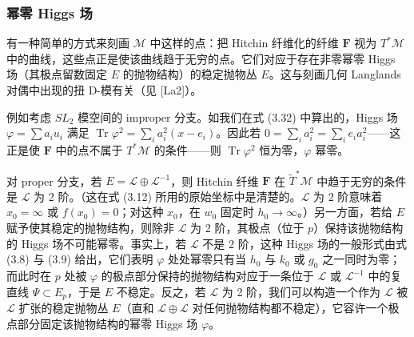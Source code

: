 \documentclass[11pt,a4paper]{article}
\newcommand{\Tr}{\operatorname{Tr}}
\begin{document}
\subsubsection{幂零 Higgs 场}

有一种简单的方式来刻画 $\mathcal{M}$ 中这样的点：把 Hitchin 纤维化的纤维 $\boldsymbol{F}$ 视为 $T^*\mathcal{M}$ 中的曲线，这些点正是使该曲线趋于无穷的点。它们对应于存在非零幂零 Higgs 场（其极点留数固定 $E$ 的抛物结构）的稳定抛物丛 $E$。这与刻画几何 Langlands 对偶中出现的扭 D-模有关（见 [La2]）。

例如考虑 $SL_2$ 模空间的 improper 分支。如我们在式 (3.32) 中算出的，Higgs 场 $\varphi=\sum a_iu_i$ 满足 $\Tr\varphi^2=\sum_ia_i^2(x-e_i)$。因此若 $0=\sum_ia_i^2=\sum_ie_ia_i^2$——这正是使 $\boldsymbol{F}$ 中的点不属于 $T^*\mathcal{M}$ 的条件——则 $\Tr\varphi^2$ 恒为零，$\varphi$ 幂零。

对 proper 分支，若 $E=\mathcal{L}\oplus\mathcal{L}^{-1}$，则 Hitchin 纤维 $\boldsymbol{F}$ 在 $\tilde{T}^*\mathcal{M}$ 中趋于无穷的条件是 $\mathcal{L}$ 为 2 阶。（这在式 (3.12) 所用的原始坐标中是清楚的。$\mathcal{L}$ 为 2 阶意味着 $x_0=\infty$ 或 $f(x_0)=0$；对这种 $x_0$，在 $w_0$ 固定时 $h_0\to\infty$。）另一方面，若给 $E$ 赋予使其稳定的抛物结构，则除非 $\mathcal{L}$ 为 2 阶，其极点（位于 $p$）保持该抛物结构的 Higgs 场不可能幂零。事实上，若 $\mathcal{L}$ 不是 2 阶，这种 Higgs 场的一般形式由式 (3.8) 与 (3.9) 给出，它们表明 $\varphi$ 处处幂零只有当 $h_0$ 与 $k_0$ 或 $g_0$ 之一同时为零；而此时在 $p$ 处被 $\varphi$ 的极点部分保持的抛物结构对应于一条位于 $\mathcal{L}$ 或 $\mathcal{L}^{-1}$ 中的复直线 $\Psi\subset E_p$，于是 $E$ 不稳定。反之，若 $\mathcal{L}$ 为 2 阶，我们可以构造一个作为 $\mathcal{L}$ 被 $\mathcal{L}$ 扩张的稳定抛物丛 $E$（直和 $\mathcal{L}\oplus\mathcal{L}$ 对任何抛物结构都不稳定），它容许一个极点部分固定该抛物结构的幂零 Higgs 场 $\varphi$。
\end{document}
